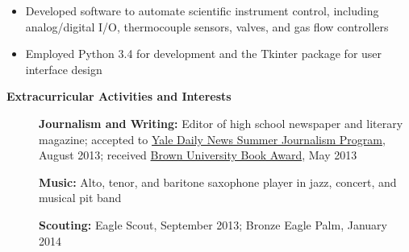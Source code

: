 \documentclass[letterpaper,10.6pt]{article}
\makeatletter
\newcommand{\resitem}[1]{\item #1 \vspace{-2pt}}
\newcommand{\resheading}[1]{{\large \colorbox{mygrey}{\begin{minipage}{\textwidth}{\textbf{#1 \vphantom{p\^{E}}}}\end{minipage}}}}
\newcommand{\ressubheading}[4]{
\begin{tabular*}{6.8in}{l@{\extracolsep{\fill}}r}
		\textbf{#1} & #2 \\
		\small{#3} & \small{#4} \\
\end{tabular*}\vspace{-6pt}}
\makeatother
\begin{document}
\begin{itemize}[leftmargin=*]
{\begin{itemize}
					\resitem{Developed software to automate scientific instrument control, including analog/digital I/O, thermocouple sensors, valves, and gas flow controllers}
					\resitem{Employed Python 3.4 for development and the Tkinter package for user interface design}
				\end{itemize}}
	\end{itemize} 

\resheading{Extracurricular Activities and Interests}
	\begin{description}
		\item[] \hspace{0.03in} \textbf{Journalism and Writing:} { \footnotesize Editor of high school newspaper and literary magazine; accepted to \href{http://yaledailynews.com/about-us/sjp/}{Yale Daily News Summer Journalism Program}, August 2013; received \href{http://www.brown.edu/campus-life/support/bookstore/book-award}{Brown University Book Award}, May 2013}
		\item[] \hspace{0.03in} \textbf{Music:} {\footnotesize Alto, tenor, and baritone saxophone player in jazz, concert, and musical pit band}
		\item[] \hspace{0.03in} \textbf{Scouting:} {\footnotesize Eagle Scout, September 2013; Bronze Eagle Palm, January 2014}
	\end{description}
\end{document}

